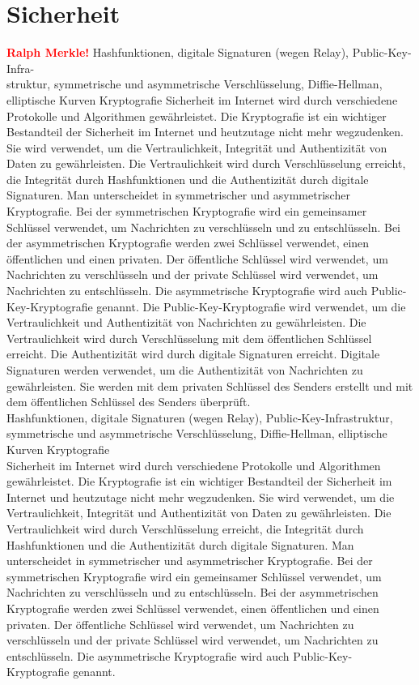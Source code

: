 \section{Sicherheit}
\label{sec:sicherheit_im}
\textbf{\textcolor{red}{Ralph Merkle!}}
Hashfunktionen, digitale Signaturen (wegen Relay), Public-Key-Infra-\\struktur, symmetrische und asymmetrische Verschlüsselung, Diffie-Hellman, elliptische Kurven Kryptografie
Sicherheit im Internet wird durch verschiedene Protokolle und Algorithmen gewährleistet. Die Kryptografie ist ein wichtiger Bestandteil der Sicherheit im Internet und heutzutage nicht mehr wegzudenken. Sie wird verwendet, um die Vertraulichkeit, Integrität und Authentizität von Daten zu gewährleisten. Die Vertraulichkeit wird durch Verschlüsselung erreicht, die Integrität durch Hashfunktionen und die Authentizität durch digitale Signaturen. Man unterscheidet in symmetrischer und asymmetrischer Kryptografie. Bei der symmetrischen Kryptografie wird ein gemeinsamer Schlüssel verwendet, um Nachrichten zu verschlüsseln und zu entschlüsseln. Bei der asymmetrischen Kryptografie werden zwei Schlüssel verwendet, einen öffentlichen und einen privaten. Der öffentliche Schlüssel wird verwendet, um Nachrichten zu verschlüsseln und der private Schlüssel wird verwendet, um Nachrichten zu entschlüsseln. Die asymmetrische Kryptografie wird auch Public-Key-Kryptografie genannt.
Die Public-Key-Kryptografie wird verwendet, um die Vertraulichkeit und Authentizität von Nachrichten zu gewährleisten. Die Vertraulichkeit wird durch Verschlüsselung mit dem öffentlichen Schlüssel erreicht. Die Authentizität wird durch digitale Signaturen erreicht. Digitale Signaturen werden verwendet, um die Authentizität von Nachrichten zu gewährleisten. Sie werden mit dem privaten Schlüssel des Senders erstellt und mit dem öffentlichen Schlüssel des Senders überprüft. \\

Hashfunktionen, digitale Signaturen (wegen Relay), Public-Key-Infrastruktur, symmetrische und asymmetrische Verschlüsselung, Diffie-Hellman, elliptische Kurven Kryptografie \\

\noindent Sicherheit im Internet wird durch verschiedene Protokolle und Algorithmen gewährleistet. Die Kryptografie ist ein wichtiger Bestandteil der Sicherheit im Internet und heutzutage nicht mehr wegzudenken. Sie wird verwendet, um die Vertraulichkeit, Integrität und Authentizität von Daten zu gewährleisten. Die Vertraulichkeit wird durch Verschlüsselung erreicht, die Integrität durch Hashfunktionen und die Authentizität durch digitale Signaturen. Man unterscheidet in symmetrischer und asymmetrischer Kryptografie. Bei der symmetrischen Kryptografie wird ein gemeinsamer Schlüssel verwendet, um Nachrichten zu verschlüsseln und zu entschlüsseln. Bei der asymmetrischen Kryptografie werden zwei Schlüssel verwendet, einen öffentlichen und einen privaten. Der öffentliche Schlüssel wird verwendet, um Nachrichten zu verschlüsseln und der private Schlüssel wird verwendet, um Nachrichten zu entschlüsseln. Die asymmetrische Kryptografie wird auch Public-Key-Kryptografie genannt. \\

